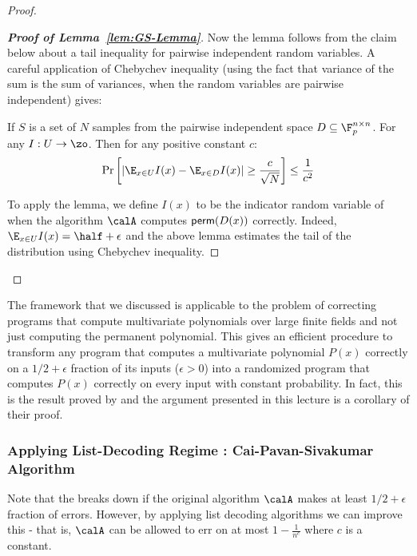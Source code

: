 \begin{proof}
\begin{proof}[\textit{\bf Proof of Lemma~\ref{lem:GS-Lemma}}]
Now the lemma follows from the claim below about a tail inequality for pairwise independent random variables. A careful application of Chebychev inequality (using the fact that variance of the sum is the sum of variances, when the random variables are pairwise independent) gives:

\begin{lemma}
If $S$ is a set of $N$ samples from the pairwise independent space $D \subseteq \F_p^{n \times n}$. For any $I : U \to \zo$. Then for any positive constant $c$:
$$\Pr \left[ \left| \E_{x \in U} I(x) - \E_{x \in D} I(x) \right| \ge \frac{c}{\sqrt{N}}\right] \le \frac{1}{c^2}$$
\end{lemma}
To apply the lemma, we define $I(x)$ to be the indicator random variable of when the algorithm $\calA$ computes ${\sf perm}(D(x))$ correctly. Indeed, $\E_{x \in U} I(x) = \half+\epsilon$ and the above lemma estimates the tail of the distribution using Chebychev inequality.
\end{proof}
\end{proof}

\begin{curiousity}
The framework that we discussed is applicable to the problem of correcting programs that compute multivariate polynomials over large finite fields and not just computing the permanent polynomial. This gives an efficient procedure to transform any program that computes a multivariate polynomial $P(x)$ correctly on a $1/2+\epsilon$ fraction of its inputs ($\epsilon > 0$) into a randomized program that computes $P(x)$ correctly on every input with constant probability. In fact, this is the result proved by \cite{GS92} and the argument presented in this lecture is a corollary of their proof.
\end{curiousity}

\subsubsection{Applying List-Decoding Regime : Cai-Pavan-Sivakumar Algorithm}

Note that the \cite{GS92} breaks down if the original algorithm $\calA$ makes at least $1/2+\epsilon$ fraction of errors. However, by applying list decoding algorithms we can improve this  - that is, $\calA$ can be allowed to err on at most $1-\frac{1}{n^c}$ where $c$ is a constant.

